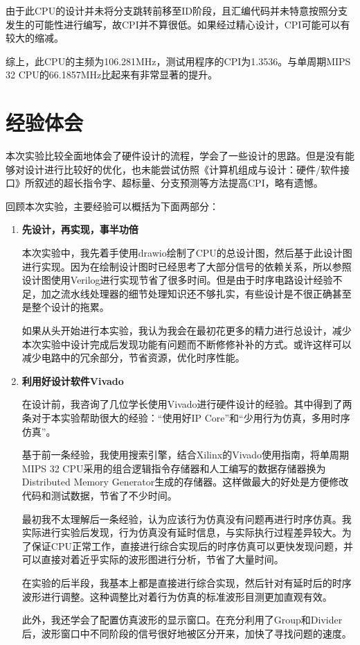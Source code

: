 \documentclass[a4paper]{article}
\begin{document}
由于此CPU的设计并未将分支跳转前移至ID阶段，且汇编代码并未特意按照分支发生的可能性进行编写，故CPI并不算很低。如果经过精心设计，CPI可能可以有较大的缩减。

综上，此CPU的主频为106.281MHz，测试用程序的CPI为1.3536。与单周期MIPS 32 CPU的66.1857MHz比起来有非常显著的提升。

\section{经验体会}

本次实验比较全面地体会了硬件设计的流程，学会了一些设计的思路。但是没有能够对设计进行比较好的优化，也未能尝试仿照《计算机组成与设计：硬件/软件接口》所叙述的超长指令字、超标量、分支预测等方法提高CPI，略有遗憾。

回顾本次实验，主要经验可以概括为下面两部分：

\begin{enumerate}
    \item \textbf{先设计，再实现，事半功倍}

          本次实验中，我先着手使用drawio绘制了CPU的总设计图，然后基于此设计图进行实现。因为在绘制设计图时已经思考了大部分信号的依赖关系，所以参照设计图使用Verilog进行实现节省了很多时间。但是由于时序电路设计经验不足，加之流水线处理器的细节处理知识还不够扎实，有些设计是不很正确甚至是整个设计的拖累。

          如果从头开始进行本实验，我认为我会在最初花更多的精力进行总设计，减少本次实验中设计完成后发现功能有问题而不断修修补补的方式。或许这样可以减少电路中的冗余部分，节省资源，优化时序性能。

    \item \textbf{利用好设计软件Vivado}

          在设计前，我咨询了几位学长使用Vivado进行硬件设计的经验。其中得到了两条对于本实验帮助很大的经验：“使用好IP Core”和“少用行为仿真，多用时序仿真”。

          基于前一条经验，我使用搜索引擎，结合Xilinx的Vivado使用指南，将单周期MIPS 32 CPU采用的组合逻辑指令存储器和人工编写的数据存储器换为Distributed Memory Generator生成的存储器。这样做最大的好处是方便修改代码和测试数据，节省了不少时间。

          最初我不太理解后一条经验，认为应该行为仿真没有问题再进行时序仿真。我实际进行实验后发现，行为仿真没有延时信息，与实际执行过程差异较大。为了保证CPU正常工作，直接进行综合实现后的时序仿真可以更快发现问题，并可以直接对着近乎实际的波形图进行分析，节省了大量时间。

          在实验的后半段，我基本上都是直接进行综合实现，然后针对有延时后的时序波形进行调整。这种调整比对着行为仿真的标准波形目测更加直观有效。

          此外，我还学会了配置仿真波形的显示窗口。在充分利用了Group和Divider后，波形窗口中不同阶段的信号很好地被区分开来，加快了寻找问题的速度。
\end{enumerate}
\end{document}
